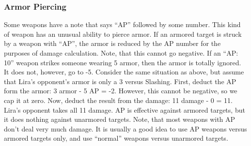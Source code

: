 \documentclass[twoside]{book}
\begin{document}
\subsubsection{Armor Piercing}
     Some weapons have a note that says
                 “AP” followed by some number. This kind of
                 weapon has an unusual ability to pierce armor. If an
                 armored target is struck by a weapon with
                 “AP”, the armor is reduced by the AP number
                 for the purposes of damage calculation. Note, that this
                 cannot go negative. If an “AP: 10” weapon
                 strikes someone wearing 5 armor, then the armor is
                 totally ignored. It does not, however, go to -5. 
    Consider the same situation as above, but assume
                 that Lira’s opponent’s armor is only a 3
                 versus Slashing. First, deduct the AP form the armor: 3
                 armor - 5 AP = -2. However, this cannot be negative, so
                 we cap it at zero. Now, deduct the result from the
                 damage: 11 damage - 0 = 11. Lira’s opponent takes
                 all 11 damage.  AP is effective against armored targets, but it
                 does nothing against unarmored targets. Note, that most
                 weapons with AP don’t deal very much damage. It is
                 usually a good idea to use AP weapons versus armored
                 targets only, and use “normal” weapons
                 versus unarmored targets. 
\end{document}
